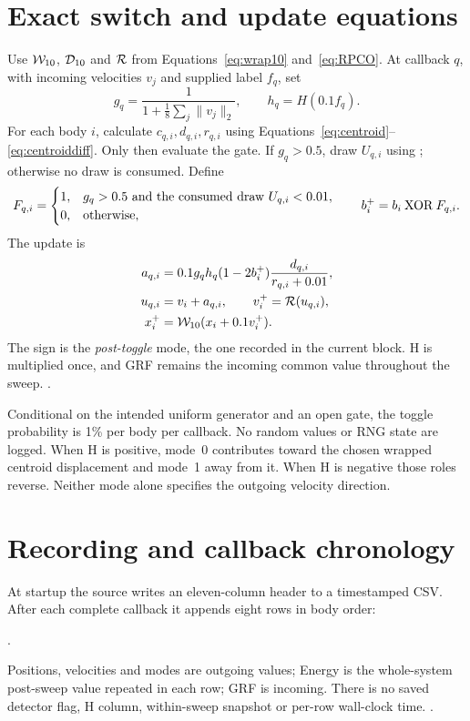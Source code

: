 \section{Exact switch and update equations}
Use $\mathcal W_{10}$, $\mathcal D_{10}$ and $\mathcal R$ from
Equations~\eqref{eq:wrap10} and~\eqref{eq:RPCO}. At callback $q$,
with incoming velocities $v_j$ and supplied label $f_q$, set
\begin{equation}\label{eq:shared03}
g_q=\frac{1}{1+\frac18\sum_j\|v_j\|_2},\qquad h_q=H(0.1f_q).
\end{equation}
For each body $i$, calculate $c_{q,i},d_{q,i},r_{q,i}$ using
Equations~\eqref{eq:centroid}--\eqref{eq:centroiddiff}. Only then
evaluate the gate. If $g_q>0.5$, draw $U_{q,i}$ using
; otherwise no draw is consumed.
Define
\begin{equation}\label{eq:toggle}
F_{q,i}=
\begin{cases}
1,&g_q>0.5\ \hbox{and the consumed draw }U_{q,i}<0.01,\\
0,&\hbox{otherwise},
\end{cases}
\qquad
b_i^+=b_i\mathbin{\mathrm{XOR}}F_{q,i}.
\end{equation}
The update is
\begin{align}
a_{q,i}
 &=0.1g_qh_q(1-2b_i^+)\frac{d_{q,i}}{r_{q,i}+0.01},\label{eq:kick03}\\
u_{q,i}&=v_i+a_{q,i},\qquad v_i^+=\mathcal R(u_{q,i}),\label{eq:vel03}\\
x_i^+&=\mathcal W_{10}(x_i+0.1v_i^+).\label{eq:pos03}
\end{align}
The sign is the \emph{post-toggle} mode, the one recorded in the current
block. H is multiplied once, and GRF remains the incoming common value
throughout the sweep. . 

Conditional on the intended uniform generator and an open gate, the
toggle probability is 1\% per body per callback. No random values or RNG
state are logged. When H is positive, mode~0 contributes toward the
chosen wrapped centroid displacement and mode~1 away from it. When H is
negative those roles reverse. Neither mode alone specifies the outgoing
velocity direction. 

\section{Recording and callback chronology}
At startup the source writes an eleven-column header to a timestamped
CSV. After each complete callback it appends eight rows in body order:
\begin{center}\small
{}.
\end{center}
Positions, velocities and modes are outgoing values; Energy is the
whole-system post-sweep value repeated in each row; GRF is incoming.
There is no saved detector flag, H column, within-sweep snapshot or
per-row wall-clock time. . 

